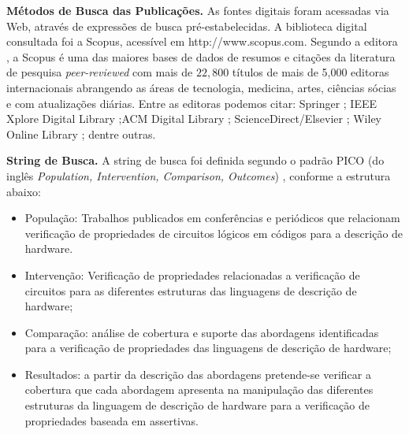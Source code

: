 \textbf{Métodos de Busca das Publicações.} As fontes digitais foram acessadas via Web, através de expressões de busca pré-estabelecidas. A biblioteca digital consultada foi a Scopus, acessível em http://www.scopus.com. Segundo a editora \cite{Elsevier}, a Scopus é uma das maiores bases de dados de resumos e citações da literatura de pesquisa \textit{peer-reviewed} com mais de $22,800$ títulos de mais de 5,000 editoras internacionais abrangendo as áreas de tecnologia, medicina, artes, ciências sócias e com atualizações diárias. Entre as editoras podemos citar: Springer \cite{Springer}; IEEE Xplore Digital Library \cite{IEEE};ACM Digital Library \cite{ACM} ; ScienceDirect/Elsevier \cite{B.V}; Wiley Online Library \cite{Sons}; dentre outras.

\textbf{String de Busca.} A string de busca foi definida segundo o padrão PICO (do inglês \textit{Population, Intervention, Comparison, Outcomes}) \cite{kitchenham2009systematic}, conforme a estrutura abaixo:
\begin{itemize}
	\item População: Trabalhos publicados em conferências e periódicos que relacionam verificação de propriedades de circuitos lógicos em códigos para a descrição de hardware.

	\item Intervenção: Verificação de propriedades relacionadas a verificação de circuitos para as diferentes estruturas das linguagens de descrição de hardware;

	\item Comparação: análise de cobertura e suporte das abordagens identificadas para a verificação de propriedades das linguagens de descrição de hardware;

	\item Resultados: a partir da descrição das abordagens pretende-se verificar a cobertura que cada abordagem apresenta na manipulação das diferentes estruturas da linguagem de descrição de hardware para a verificação de propriedades baseada em assertivas.
\end{itemize}

